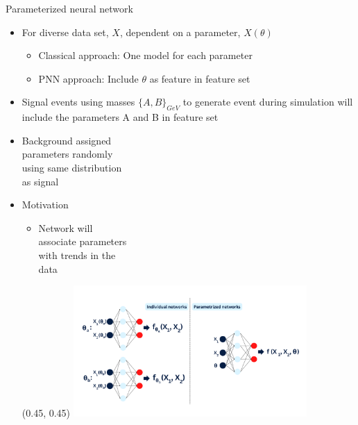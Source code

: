 \documentclass[UKenglish]{beamer}
\begin{document}
\begin{frame}{Parameterized neural network}
    \begin{itemize}
        \item For diverse data set, $X$, dependent on a parameter, $X(\theta)$
        \begin{itemize}
            \item Classical approach: One model for each parameter
            \item PNN approach: Include $\theta$ as feature in feature set
        \end{itemize}
        \item Signal events using masses $\{A,B\}_{GeV}$ to generate 
              event during simulation will include the parameters A and B
              in feature set
        \item Background assigned \\
              parameters randomly \\
              using same distribution\\ 
              as signal
        \item Motivation
        \begin{itemize}
            \item Network will \\
                  associate parameters\\
                  with trends in the \\
                  data
        \end{itemize}
        \begin{textblock}{0.8}(0.45, 0.45)
            \includegraphics[width = 0.7\textwidth]{figures/PNN.png}
        \end{textblock}
    \end{itemize}
\end{frame}
\end{document}
